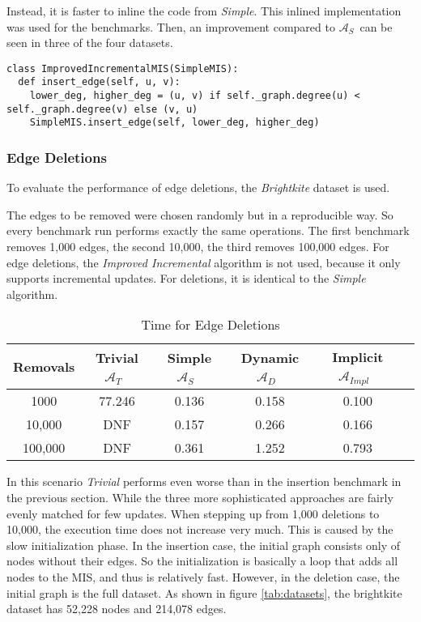 \documentclass[letterpaper,11pt]{article}
\newcommand{\trivial}{$\mathcal{A}_T$\ }
\newcommand{\simple}{$\mathcal{A}_S$\ }
\newcommand{\dynamic}{$\mathcal{A}_{D}$\ }
\newcommand{\implicit}{$\mathcal{A}_{Impl}$\ }
\begin{document}
Instead, it is faster to inline the code from \textit{Simple}. This inlined
implementation was used for the benchmarks. Then, an improvement compared to
\simple can be seen in three of the four datasets.

\begin{lstlisting}[label={lst:slowinc}, caption={Slow implementation}]
class ImprovedIncrementalMIS(SimpleMIS):
  def insert_edge(self, u, v):
    lower_deg, higher_deg = (u, v) if self._graph.degree(u) < self._graph.degree(v) else (v, u)
    SimpleMIS.insert_edge(self, lower_deg, higher_deg)
\end{lstlisting}


\subsubsection{Edge Deletions}
\label{sec:edgedeletion}

To evaluate the performance of edge deletions, the \textit{Brightkite}
\cite{konect:2016:loc-brightkite_edges, konect:cho2011, konect} dataset is used.

The edges to be removed were chosen randomly but in a reproducible way. So every
benchmark run performs exactly the same operations. The first benchmark removes
1,000 edges, the second 10,000, the third removes 100,000 edges. For edge
deletions, the \textit{Improved Incremental} algorithm is not used, because it
only supports incremental updates. For deletions, it is identical to the
\textit{Simple} algorithm.

\begin{table}[h]
  \caption{Time for Edge Deletions}
  \label{tab:deletion}
  \centering
  \setlength{\extrarowheight}{0.3em}
	\begin{tabular}{|c|c|c|c|c|c|}
		\hline
		Removals & Trivial \trivial & Simple \simple & Dynamic \dynamic & Implicit \implicit \\
		\hline
		\hline
		1000 & 77.246 & 0.136 & 0.158 & 0.100 \\ %
		\hline
		10,000 & DNF & 0.157 & 0.266 & 0.166 \\
		\hline
		100,000 & DNF & 0.361 & 1.252 & 0.793 \\
		\hline
	\end{tabular}
\end{table}

In this scenario \textit{Trivial} performs even worse than in the insertion
benchmark in the previous section. While the three more sophisticated approaches are fairly evenly matched
for few updates. When stepping up from 1,000 deletions to 10,000, the execution
time does not increase very much. This is caused by the slow initialization
phase. In the insertion case, the initial graph consists only of nodes without
their edges. So the initialization is basically a loop that adds all nodes to
the MIS, and thus is relatively fast. However, in the deletion case, the initial
graph is the full dataset. As shown in figure \ref{tab:datasets}, the brightkite
dataset has 52,228 nodes and 214,078 edges.
\end{document}
